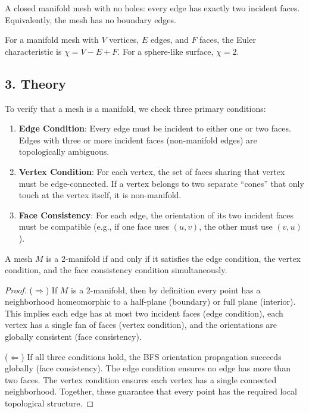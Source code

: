 \begin{definition}[Watertight]\label{def:watertight}
A closed manifold mesh with no holes: every edge has exactly two incident faces. Equivalently, the mesh has no boundary edges.
\end{definition}

\begin{definition}\label{def:euler_char_manifold}
For a manifold mesh with $V$ vertices, $E$ edges, and $F$ faces, the Euler characteristic is $\chi = V - E + F$. For a sphere-like surface, $\chi = 2$.
\end{definition}

\subsection{3. Theory}

To verify that a mesh is a manifold, we check three primary conditions\cite{botsch2010}:
\begin{enumerate}
    \item \textbf{Edge Condition}: Every edge must be incident to either one or two faces. Edges with three or more incident faces (non-manifold edges) are topologically ambiguous.
    \item \textbf{Vertex Condition}: For each vertex, the set of faces sharing that vertex must be edge-connected. If a vertex belongs to two separate ``cones'' that only touch at the vertex itself, it is non-manifold.
    \item \textbf{Face Consistency}: For each edge, the orientation of its two incident faces must be compatible (e.g., if one face uses $(u, v)$, the other must use $(v, u)$).
\end{enumerate}

\begin{theorem}\label{thm:manifold_correctness}
A mesh $M$ is a 2-manifold if and only if it satisfies the edge condition, the vertex condition, and the face consistency condition simultaneously.
\end{theorem}

\begin{proof}
($\Rightarrow$) If $M$ is a 2-manifold, then by definition every point has a neighborhood homeomorphic to a half-plane (boundary) or full plane (interior). This implies each edge has at most two incident faces (edge condition), each vertex has a single fan of faces (vertex condition), and the orientations are globally consistent (face consistency).

($\Leftarrow$) If all three conditions hold, the BFS orientation propagation succeeds globally (face consistency). The edge condition ensures no edge has more than two faces. The vertex condition ensures each vertex has a single connected neighborhood. Together, these guarantee that every point has the required local topological structure.
\end{proof}

